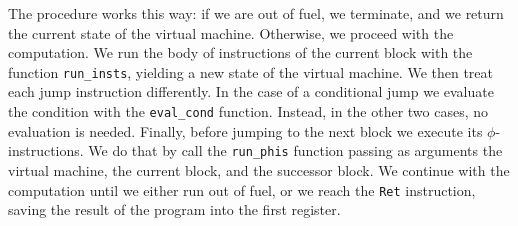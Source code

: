 The procedure works this way: if we are out of fuel, we terminate, and we return the current state of the virtual machine. Otherwise, we proceed with the computation.
We run the body of instructions of the current block with the function \texttt{run\_insts}, yielding a new state of the virtual machine. We then treat each jump instruction differently. In the case of a conditional jump we evaluate the condition with the \texttt{eval\_cond} function. Instead, in the other two cases, no evaluation is needed. Finally, before jumping to the next block we execute its $\phi$-instructions. We do that by call the \texttt{run\_phis} function passing as arguments the virtual machine, the current block, and the successor block.
We continue with the computation until we either run out of fuel, or we reach the \texttt{Ret} instruction, saving the result of the program into the first register.